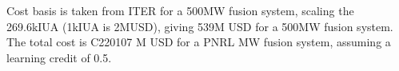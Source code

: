 Cost basis is taken from ITER for a 500MW fusion system, scaling the 269.6kIUA (1kIUA is 2MUSD), giving 539M USD for a 500MW fusion system. The total cost is C220107 M USD for a PNRL MW fusion system, assuming a learning credit of 0.5.






